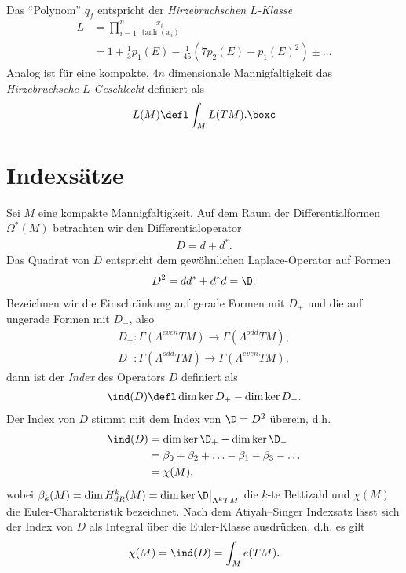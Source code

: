 \documentclass[%
	paper=a5,%
	fleqn,%
	DIV=18,%
	BCOR=0mm,
	fontsize=11pt,
	titlepage=false,%
	bibliography=totoc,
	DIV=18,%
	twoside=true,
	pdftitle=Riemannsche Geometrie,
	pdfauthor=Uwe Semmelmann,
	numbers=noendperiod]%
	{scrbook}
\begin{document}
\begin{ex}
\begin{exenum}
\begin{align*}
\end{align*}
Das ``Polynom'' $q_{f}$ entspricht der \emph{Hirzebruchschen $L$-Klasse}
\begin{align*}
L &= \prod_{i=1}^n \frac{x_{i}}{\tanh(x_{i})}\\
&= 1 + \frac{1}{3}p_{1}(E) - \frac{1}{45}\left(7p_{2}(E) - p_{1}(E)^2\right) \pm \ldots
\end{align*}
Analog ist für eine kompakte, $4n$ dimensionale Mannigfaltigkeit das \emph{Hirzebruchsche $L$-Geschlecht} definiert als
\begin{align*}
L(M) \defl \int_{M} L(TM).\boxc
\end{align*}
\end{exenum}
\end{ex}

\section{Indexsätze}

Sei $M$ eine kompakte Mannigfaltigkeit. Auf dem Raum der Differentialformen $\Omega^*(M)$ betrachten wir den Differentialoperator
\begin{align*}
D = d + d^*.
\end{align*}
Das Quadrat von $D$ entspricht dem gewöhnlichen Laplace-Operator auf Formen
\begin{align*}
D^2 = dd^*+d^*d = \D.
\end{align*}
Bezeichnen wir die Einschränkung auf gerade Formen mit $D_{+}$ und die auf ungerade Formen mit $D_{-}$, also
\begin{align*}
D_{+} \colon \Gamma(\Lambda^{even}TM)\to \Gamma(\Lambda^{odd}TM),\\
D_{-} \colon \Gamma(\Lambda^{odd}TM)\to \Gamma(\Lambda^{even}TM),
\end{align*}
dann ist der \emph{Index} des Operators $D$ definiert als
\begin{align*}
\ind(D)\defl \dim \ker D_{+} - \dim \ker D_{-}.
\end{align*}
Der Index von $D$ stimmt mit dem Index von $\D=D^2$ überein, d.h.
\begin{align*}
\ind(D)
& = \dim \ker \D_{+} - \dim \ker \D_{-}\\ & =
\beta_{0} + \beta_{2} + \ldots - \beta_{1}-\beta_{3}-\ldots\\
&=\chi(M),
\end{align*}
wobei $\beta_{k}(M) = \dim H^k_{dR}(M) = \dim \ker \D\big|_{\Lambda^k TM}$ die $k$-te Bettizahl und $\chi(M)$ die Euler-Charakteristik bezeichnet.
Nach dem Atiyah–Singer Indexsatz lässt sich der Index von $D$ als Integral über die Euler-Klasse ausdrücken, d.h. es gilt
\begin{align*}
\chi(M) = \ind(D) = \int_{M} e(TM).
\end{align*}
\end{document}

